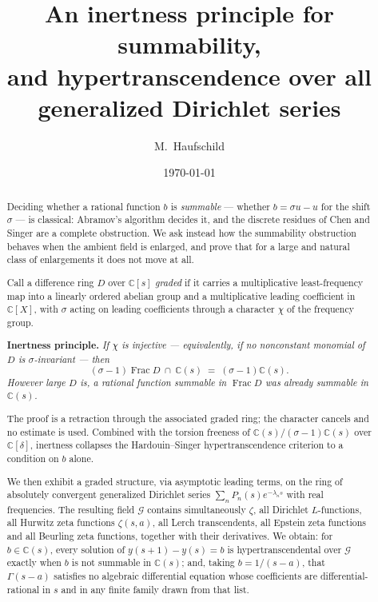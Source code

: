 \documentclass[11pt,a4paper]{amsart}
\theoremstyle{plain}
\theoremstyle{definition}
\newcommand{\CC}{\mathbb{C}}
\newcommand{\sig}{\sigma}
\newcommand{\dd}{\delta}
\newcommand{\Frac}{\operatorname{Frac}}
\newcommand{\GG}{\mathcal{G}}
\begin{document}
\title[An inertness principle for summability]{An inertness principle for summability,\\ and
hypertranscendence over all generalized Dirichlet series}

\author{M.~Haufschild}
\address{Independent researcher}

\date{\today}


\begin{abstract}
Deciding whether a rational function $b$ is \emph{summable} --- whether $b=\sig u-u$ for the shift
$\sig$ --- is classical: Abramov's algorithm decides it, and the discrete residues of Chen and Singer
are a complete obstruction. We ask instead how the summability obstruction behaves when the ambient
field is enlarged, and prove that for a large and natural class of enlargements it does not move at
all.

Call a difference ring $D$ over $\CC[s]$ \emph{graded} if it carries a multiplicative least-frequency
map into a linearly ordered abelian group and a multiplicative leading coefficient in $\CC[X]$, with
$\sig$ acting on leading coefficients through a character $\chi$ of the frequency group.

\smallskip
\noindent\textbf{Inertness principle.} \emph{If $\chi$ is injective --- equivalently, if no
nonconstant monomial of $D$ is $\sig$-invariant --- then}
\[
  (\sig-1)\Frac D\ \cap\ \CC(s)\;=\;(\sig-1)\CC(s).
\]
\emph{However large $D$ is, a rational function summable in $\Frac D$ was already summable in
$\CC(s)$.}
\smallskip

The proof is a retraction through the associated graded ring; the character cancels and no estimate
is used. Combined with the torsion freeness of $\CC(s)/(\sig-1)\CC(s)$ over $\CC[\dd]$, inertness
collapses the Hardouin--Singer hypertranscendence criterion to a condition on $b$ alone.

We then exhibit a graded structure, via asymptotic leading terms, on the ring of absolutely
convergent generalized Dirichlet series $\sum_nP_n(s)e^{-\lambda_ns}$ with real frequencies. The
resulting field $\GG$ contains simultaneously $\zeta$, all Dirichlet $L$-functions, all Hurwitz zeta
functions $\zeta(s,a)$, all Lerch transcendents, all Epstein zeta functions and all Beurling zeta
functions, together with their derivatives. We obtain: for $b\in\CC(s)$, every solution of
$y(s+1)-y(s)=b$ is hypertranscendental over $\GG$ exactly when $b$ is not summable in $\CC(s)$; and,
taking $b=1/(s-a)$, that $\Gamma(s-a)$ satisfies no algebraic differential equation whose
coefficients are differential-rational in $s$ and in any finite family drawn from that list.
\end{abstract}
\end{document}
